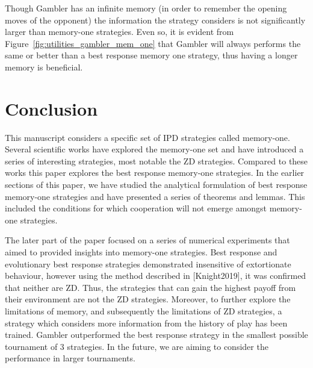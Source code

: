 \documentclass[10pt]{article}
\begin{document}
Though Gambler has an infinite memory (in order to remember the opening moves of
the opponent) the information the strategy considers is not significantly larger
than memory-one strategies. Even so, it is evident from
Figure~\ref{fig:utilities_gambler_mem_one} that Gambler will always performs the
same or better than a best response memory one strategy, thus having a longer
memory is beneficial.


\section{Conclusion}

This manuscript considers a specific set of IPD strategies called memory-one.
Several scientific works have explored the memory-one set and have introduced a
series of interesting strategies, most notable the ZD strategies. Compared to
these works this paper explores the best response memory-one strategies. In the
earlier sections of this paper, we have studied the analytical formulation of
best response memory-one strategies and have presented a series of theorems and
lemmas. This included the conditions for which cooperation will not emerge
amongst memory-one strategies.

The later part of the paper focused on a series of numerical experiments that
aimed to provided insights into memory-one strategies. Best response and
evolutionary best response strategies demonstrated insensitive of extortionate
behaviour, however using the method described in [Knight2019], it was confirmed
that neither are ZD. Thus, the strategies that can gain the highest payoff from
their environment are not the ZD strategies. Moreover, to further explore the
limitations of memory, and subsequently the limitations of ZD strategies, a
strategy which considers more information from the history of play has been
trained. Gambler outperformed the best response strategy in the smallest
possible tournament of 3 strategies. In the future, we are aiming to consider
the performance in larger tournaments.
\end{document}
